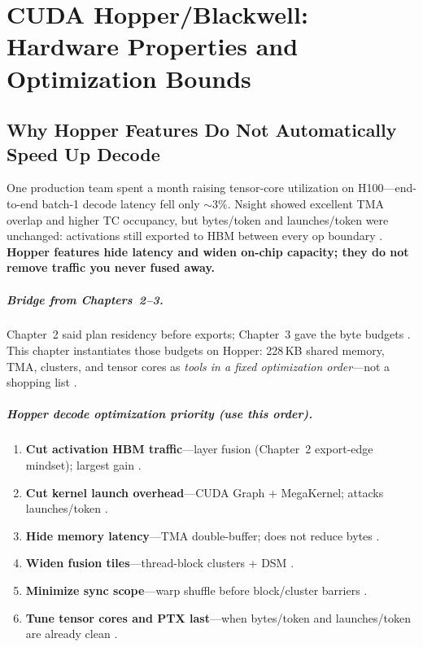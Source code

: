 \chapter{CUDA Hopper/Blackwell: Hardware Properties and Optimization Bounds}
\label{chap:ch04}

\section{Why Hopper Features Do Not Automatically Speed Up Decode}
\label{sec:industrial_hook}

One production team spent a month raising tensor-core utilization on H100---end-to-end batch-1 decode latency fell only ${\sim}3\%$.
Nsight showed excellent TMA overlap and higher TC occupancy, but bytes/token and launches/token were unchanged: activations still exported to HBM between every op boundary \citep{memoryfloor2026,taxbreak2026}.
\textbf{Hopper features hide latency and widen on-chip capacity; they do not remove traffic you never fused away.}

\paragraph{Bridge from Chapters~2--3.}
Chapter~2 said plan residency before exports; Chapter~3 gave the byte budgets \citep{yirage2026,chen2020compilerbasedhardw}.
This chapter instantiates those budgets on Hopper: 228\,KB shared memory, TMA, clusters, and tensor cores as \emph{tools in a fixed optimization order}---not a shopping list \citep{nvidia2022hopper,semianalysis2024tma}.

\paragraph{Hopper decode optimization priority (use this order).}
\begin{enumerate}
\item \textbf{Cut activation HBM traffic}---layer fusion (Chapter~2 export-edge mindset); largest gain \citep{memoryfloor2026,dao2022flashattention}.
\item \textbf{Cut kernel launch overhead}---CUDA Graph + MegaKernel; attacks launches/token \citep{taxbreak2026,nvidia2024cudagraphs}.
\item \textbf{Hide memory latency}---TMA double-buffer; does not reduce bytes \citep{semianalysis2024tma}.
\item \textbf{Widen fusion tiles}---thread-block clusters + DSM \citep{nvidia2022hopper}.
\item \textbf{Minimize sync scope}---warp shuffle before block/cluster barriers \citep{dao2022flashattention}.
\item \textbf{Tune tensor cores and PTX last}---when bytes/token and launches/token are already clean \citep{patel2025llminference,memoryfloor2026}.
\end{enumerate}


